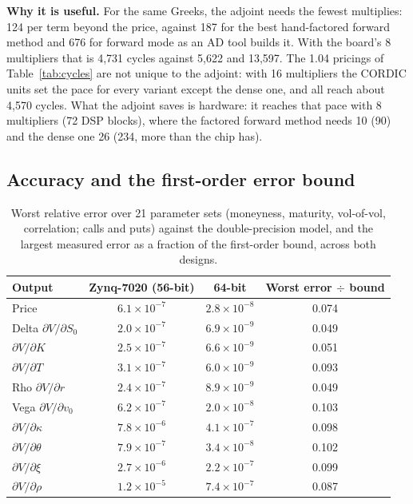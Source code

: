 \documentclass[11pt,a4paper]{article}
\newcommand{\useful}[1]{\par\noindent\textbf{\textcolor{accent}{Why it is useful.}} #1\par}
\begin{document}
\useful{For the same Greeks, the adjoint needs the fewest multiplies: 124 per term
beyond the price, against 187 for the best hand-factored forward method and 676 for
forward mode as an AD tool builds it. With the board's 8 multipliers that is 4,731
cycles against 5,622 and 13,597. The 1.04 pricings of Table~\ref{tab:cycles} are not
unique to the adjoint: with 16 multipliers the CORDIC units set the pace for every
variant except the dense one, and all reach about 4,570 cycles. What the adjoint saves
is hardware: it reaches that pace with 8 multipliers (72 DSP blocks), where the
factored forward method needs 10 (90) and the dense one 26 (234, more than the chip
has).}

\subsection{Accuracy and the first-order error bound}
\begin{table}[H]
\centering
\small
\begin{tabular}{@{}lccc@{}}
\toprule
\textbf{Output} & \textbf{Zynq-7020 (56-bit)} & \textbf{64-bit} & \textbf{Worst error $\div$ bound}\\
\midrule
Price & $6.1\times10^{-7}$ & $2.8\times10^{-8}$ & 0.074\\
Delta $\partial V/\partial S_0$ & $2.0\times10^{-7}$ & $6.9\times10^{-9}$ & 0.049\\
$\partial V/\partial K$ & $2.5\times10^{-7}$ & $6.6\times10^{-9}$ & 0.051\\
$\partial V/\partial T$ & $3.1\times10^{-7}$ & $6.0\times10^{-9}$ & 0.093\\
Rho $\partial V/\partial r$ & $2.4\times10^{-7}$ & $8.9\times10^{-9}$ & 0.049\\
Vega $\partial V/\partial v_0$ & $6.2\times10^{-7}$ & $2.0\times10^{-8}$ & 0.103\\
$\partial V/\partial\kappa$ & $7.8\times10^{-6}$ & $4.1\times10^{-7}$ & 0.098\\
$\partial V/\partial\theta$ & $7.9\times10^{-7}$ & $3.4\times10^{-8}$ & 0.102\\
$\partial V/\partial\xi$ & $2.7\times10^{-6}$ & $2.2\times10^{-7}$ & 0.099\\
$\partial V/\partial\rho$ & $1.2\times10^{-5}$ & $7.4\times10^{-7}$ & 0.087\\
\bottomrule
\end{tabular}
\caption{Worst relative error over 21 parameter sets (moneyness, maturity, vol-of-vol,
correlation; calls and puts) against the double-precision model, and the largest
measured error as a fraction of the first-order bound, across both designs.}
\label{tab:acc}
\end{table}
\end{document}

